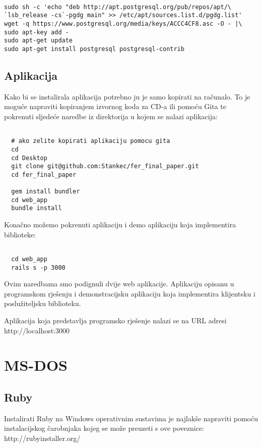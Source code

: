 \documentclass[times, utf8, zavrsni]{fer}
\begin{document}
\begin{lstlisting}

sudo sh -c 'echo "deb http://apt.postgresql.org/pub/repos/apt/\
`lsb_release -cs`-pgdg main" >> /etc/apt/sources.list.d/pgdg.list'
wget -q https://www.postgresql.org/media/keys/ACCC4CF8.asc -O - |\
sudo apt-key add -
sudo apt-get update
sudo apt-get install postgresql postgresql-contrib

\end{lstlisting}

\subsection{Aplikacija}
Kako bi se instalirala aplikacija potrebno ju je samo kopirati na računalo.
To je moguće napraviti kopiranjem izvornog koda za CD-a ili pomoću Gita te
pokrenuti sljedeće naredbe iz direktorija u kojem se nalazi aplikacija:

\begin{lstlisting}

  # ako zelite kopirati aplikaciju pomocu gita
  cd
  cd Desktop
  git clone git@github.com:Stankec/fer_final_paper.git
  cd fer_final_paper

  gem install bundler
  cd web_app
  bundle install

\end{lstlisting}

Konačno možemo pokrenuti aplikaciju i demo aplikaciju koja implementira
biblioteke:

\begin{lstlisting}

  cd web_app
  rails s -p 3000

\end{lstlisting}

Ovim naredbama smo podignuli dvije web aplikacije. Aplikaciju opisanu u
programskom rješenju i demonstracijsku aplikaciju koja implementira klijentsku
i poslužiteljsku biblioteku.

Aplikacija koja predstavlja programsko rješenje nalazi se na URL adresi
http://localhost:3000

\section{MS-DOS}
\subsection{Ruby}
Instalirati Ruby na Windows operativnim sustavima je najlakše napraviti pomoću
instalacijskog čarobnjaka kojeg se može preuzeti s ove poveznice:
http://rubyinstaller.org/
\end{document}
